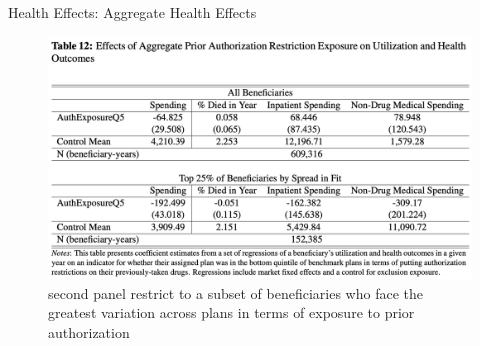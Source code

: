 \begin{frame}{Health Effects: Aggregate Health Effects}
    \begin{figure}
        \centering
        \includegraphics[width=0.75\linewidth]{tb12-health-effect.png}
        \caption{second panel restrict to a subset of beneficiaries who face the greatest variation across plans in terms of exposure to prior authorization}
    \end{figure}
\end{frame}